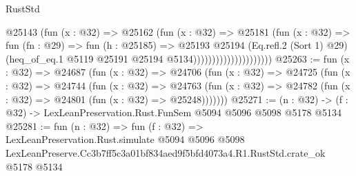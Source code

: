 \begin{lexlean}{RustStd}
\begin{coremodule}
                                    @25143
                                      (fun (x : @32) =>
                                      @25162
                                        (fun (x : @32) =>
                                        @25181
                                          (fun (x : @32) =>
                                          fun (fn : @29) =>
                                          fun (h : @25185) =>
                                          @25193
                                            @25194
                                            (Eq.refl.{2} (Sort 1) @29)
                                            (heq_of_eq.{1}
                                              @5119
                                              @25191
                                              @25194
                                              @5134)))))))))))))))))))))
@25263 := fun (x : @32) =>
  @24687
    (fun (x : @32) =>
    @24706
      (fun (x : @32) =>
      @24725
        (fun (x : @32) =>
        @24744
          (fun (x : @32) =>
          @24763 (fun (x : @32) => @24782 (fun (x : @32) => @24801 (fun (x : @32) => @25248)))))))
@25271 := (n : @32) -> (f : @32) -> LexLeanPreservation.Rust.FunSem @5094 @5096 @5098 @5178 @5134
@25281 := fun (n : @32) =>
  fun (f : @32) =>
  LexLeanPreservation.Rust.simulate
    @5094
    @5096
    @5098
    LexLeanPreserve.Cc3b7ff5c3a01bf834aed9f5bfd4073a4.R1.RustStd.crate_ok
    @5178
    @5134
\end{coremodule}
\end{lexlean}
